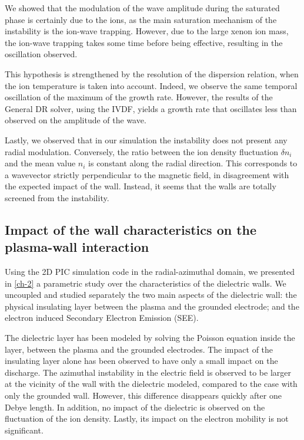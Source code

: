    We showed that the modulation of the wave amplitude during the saturated phase is certainly due to the ions, as the main saturation mechanism of the instability is the ion-wave trapping.
    However, due to the large xenon ion mass, the ion-wave trapping takes some time before being effective, resulting in the oscillation observed.

    This hypothesis is strengthened by the resolution of the dispersion relation, when the ion temperature is taken into account.
    Indeed, we observe the same temporal oscillation of the maximum of the  growth rate.
    However, the results of the General DR solver, using the IVDF, yields a growth rate that oscillates less than observed on the amplitude of the wave.

    Lastly, we observed that in our simulation the instability does not present any radial modulation.
    Conversely, the ratio between the ion density fluctuation $\delta n_i$ and the mean value $n_i$ is constant along the radial direction. 
    This corresponds to a wavevector strictly perpendicular to the magnetic field, in disagreement with the expected impact of the wall.
    Instead, it seems that the walls are totally screened from the instability.

  \subsection{Impact of the wall characteristics on the plasma-wall interaction }
    Using the 2D PIC simulation code in the radial-azimuthal domain, we presented in \cref{ch-2} a parametric study over the characteristics of the dielectric walls.
    We uncoupled and studied separately the two main aspects of the dielectric wall\string: the physical insulating layer between the plasma and the grounded electrode; and the electron induced Secondary Electron Emission (SEE).

    The dielectric layer has been modeled by solving the Poisson equation inside the layer, between the plasma and the grounded electrodes.
    The impact of the insulating layer alone has been observed to have only a small impact on the discharge.
    The azimuthal instability in the electric field is observed to be larger at the vicinity of the wall with the dielectric modeled, compared to the case with only the grounded wall.
    However, this difference disappears quickly after one Debye length.
    In addition, no impact of the dielectric is observed on the fluctuation of the ion density.
    Lastly, its impact on the electron mobility is not significant.


